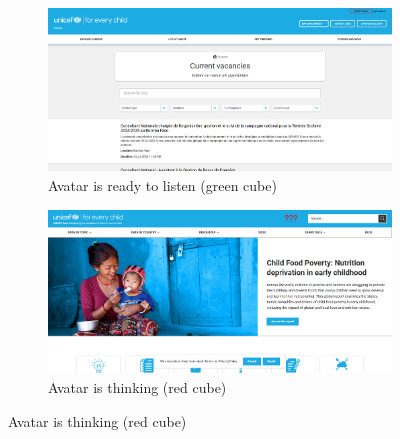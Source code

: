 \begin{figure}[h]
    \centering
	\begin{subfigure}[b]{0.40\textwidth}
        \centering
        \includegraphics[width=\textwidth]{img/critical_heuristics/N3.2a.png}
        \caption{Avatar is ready to listen (green cube)}
        \label{fig:greenlight}
    \end{subfigure}
    \hfill
    \begin{subfigure}[b]{0.40\textwidth}
        \centering
        \includegraphics[width=\textwidth]{img/critical_heuristics/N3.2b.png}
        \caption{Avatar is thinking (red cube)}
        \label{fig:redlight}
    \end{subfigure}
\end{figure}


